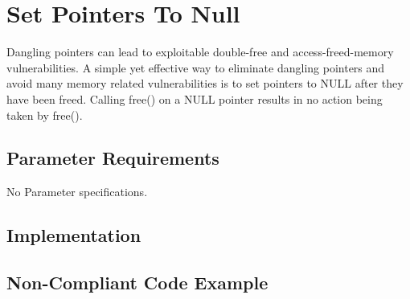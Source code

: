 %
%

\section{Set Pointers To Null}
\label{SetPointersToNull::overview}

Dangling pointers can lead to exploitable double-free and access-freed-memory
vulnerabilities. A simple yet effective way to eliminate dangling pointers and
avoid many memory related vulnerabilities is to set pointers to NULL after they
have been freed. Calling free() on a NULL pointer results in no action being
taken by free().

\subsection{Parameter Requirements}

   No Parameter specifications.

\subsection{Implementation}


\subsection{Non-Compliant Code Example}

